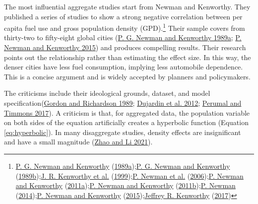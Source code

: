 \documentclass[
  12pt,
]{article}
\begin{document}
The most influential aggregate studies start from Newman and Kenworthy. They published a series of studies to show a strong negative correlation between per capita fuel use and gross population density (GPD).\footnote{\protect\hyperlink{ref-newmanCITIESAUTOMOBILEDEPENDENCE1989}{P. G. Newman and Kenworthy} (\protect\hyperlink{ref-newmanCITIESAUTOMOBILEDEPENDENCE1989}{1989a});\protect\hyperlink{ref-newmanGasolineConsumptionCities1989}{P. G. Newman and Kenworthy} (\protect\hyperlink{ref-newmanGasolineConsumptionCities1989}{1989b});\protect\hyperlink{ref-kenworthyINTERNATIONALSOURCEBOOKAUTOMOBILE1999}{J. R. Kenworthy et al.} (\protect\hyperlink{ref-kenworthyINTERNATIONALSOURCEBOOKAUTOMOBILE1999}{1999});\protect\hyperlink{ref-newmanUrbanDesignReduce2006}{P. Newman et al.} (\protect\hyperlink{ref-newmanUrbanDesignReduce2006}{2006});\protect\hyperlink{ref-newmanPeakCarUse2011}{P. Newman and Kenworthy} (\protect\hyperlink{ref-newmanPeakCarUse2011}{2011a});\protect\hyperlink{ref-newmanDensityMultiplierResponse2011}{P. Newman and Kenworthy} (\protect\hyperlink{ref-newmanDensityMultiplierResponse2011}{2011b});\protect\hyperlink{ref-newmanDensitySustainabilityMultiplier2014}{P. Newman} (\protect\hyperlink{ref-newmanDensitySustainabilityMultiplier2014}{2014});\protect\hyperlink{ref-newmanEndAutomobileDependence2015}{P. Newman and Kenworthy} (\protect\hyperlink{ref-newmanEndAutomobileDependence2015}{2015});\protect\hyperlink{ref-kenworthyAutomobileDependenceEmerging2017}{Jeffrey R. Kenworthy} (\protect\hyperlink{ref-kenworthyAutomobileDependenceEmerging2017}{2017})} Their sample covers from thirty-two to fifty-eight global cities (\protect\hyperlink{ref-newmanCITIESAUTOMOBILEDEPENDENCE1989}{P. G. Newman and Kenworthy 1989a}; \protect\hyperlink{ref-newmanEndAutomobileDependence2015}{P. Newman and Kenworthy 2015}) and produces compelling results. Their research points out the relationship rather than estimating the effect size. In this way, the denser cities have less fuel consumption, implying less automobile dependence. This is a concise argument and is widely accepted by planners and policymakers.

The criticisms include their ideological grounds, dataset, and model specification(\protect\hyperlink{ref-gordonGasolineConsumptionCities1989}{Gordon and Richardson 1989}; \protect\hyperlink{ref-dujardinHometoworkCommutingUrban2012}{Dujardin et al. 2012}; \protect\hyperlink{ref-perumalContextualDensityUS2017}{Perumal and Timmons 2017}). A criticism is that, for aggregated data, the population variable on both sides of the equation artificially creates a hyperbolic function (Equation \eqref{eq:hyperbolic}). In many disaggregate studies, density effects are insignificant and have a small magnitude (\protect\hyperlink{ref-zhaoRethinkingDeterminantsVehicle2021}{Zhao and Li 2021}).
\end{document}
